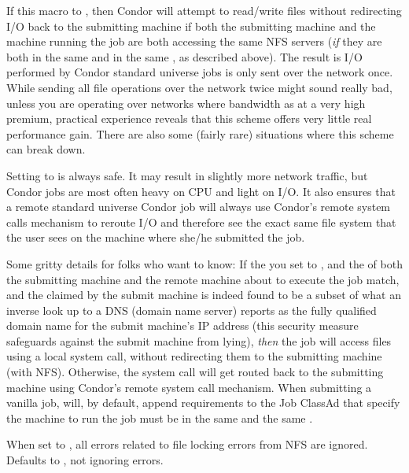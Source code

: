 \begin{description}
  If this macro to , then Condor will attempt to
  read/write files without redirecting I/O back to the submitting
  machine if both the submitting machine and the machine running the job
  are both accessing the same NFS servers (\emph{if} they are both in the
  same  and in the same ,
  as described above).  The result is I/O performed by Condor standard
  universe jobs is only sent over the network once.  
  While sending all file operations over the network twice might sound
  really bad, unless you are operating over networks where bandwidth
  as at a very high premium, practical experience reveals that this
  scheme offers very little real performance gain.  There are also
  some (fairly rare) situations where this scheme can break down.
  
  Setting  to  is always safe.  It may result
  in slightly more network traffic, but Condor jobs are most often heavy
  on CPU and light on I/O.  It also ensures that a remote
  standard universe Condor job will always use Condor's remote system
  calls mechanism to reroute I/O and therefore see the exact same
  file system that the user sees on the machine where she/he submitted
  the job.
  
  Some gritty details for folks who want to know: If the you set
   to , and the  of
  both the submitting machine and the remote machine about to execute
  the job match, and the  claimed by the
  submit machine is indeed found to be a subset of what an inverse
  look up to a DNS (domain name server) reports as the fully qualified
  domain name for the submit machine's IP address (this security
  measure safeguards against the submit machine from lying),
  \emph{then} the job will access files using a local system call,
  without redirecting them to the submitting machine (with
  NFS).  Otherwise, the system call will get routed back to the
  submitting machine using Condor's remote system call mechanism.
  \Note When submitting a vanilla job,  will, by default,
  append requirements to the Job ClassAd that specify the machine to run
  the job must be in the same  and the same
  .

\item[\Macro{IGNORE\_NFS\_LOCK\_ERRORS}] \label{param:IgnoreNFSLockErrors}
  When set to , all errors related to file locking errors from
  NFS are ignored.
  Defaults to , not ignoring errors.
  

\end{description}
